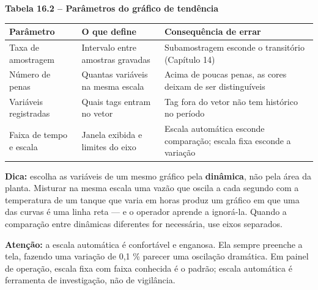 \textbf{Tabela 16.2 -- Parâmetros do gráfico de tendência}

\begin{longtable}[]{@{}
  >{\raggedright\arraybackslash}p{}
  >{\raggedright\arraybackslash}p{}
  >{\raggedright\arraybackslash}p{}@{}}
\toprule\noalign{}
\begin{minipage}[b]{\linewidth}\raggedright
Parâmetro
\end{minipage} & \begin{minipage}[b]{\linewidth}\raggedright
O que define
\end{minipage} & \begin{minipage}[b]{\linewidth}\raggedright
Consequência de errar
\end{minipage} \\
\midrule\noalign{}
\endhead
\bottomrule\noalign{}
\endlastfoot
Taxa de amostragem & Intervalo entre amostras gravadas & Subamostragem esconde o transitório (Capítulo 14) \\
Número de penas & Quantas variáveis na mesma escala & Acima de poucas penas, as cores deixam de ser distinguíveis \\
Variáveis registradas & Quais tags entram no vetor & Tag fora do vetor não tem histórico no período \\
Faixa de tempo e escala & Janela exibida e limites do eixo & Escala automática esconde comparação; escala fixa esconde a variação \\
\end{longtable}

\begin{caixadica}

\textbf{Dica:} escolha as variáveis de um mesmo gráfico pela \textbf{dinâmica}, não pela área da planta.
Misturar na mesma escala uma vazão que oscila a cada segundo com a temperatura de um tanque que
varia em horas produz um gráfico em que uma das curvas é uma linha reta --- e o operador aprende a
ignorá-la. Quando a comparação entre dinâmicas diferentes for necessária, use eixos separados.

\end{caixadica}

\begin{caixaatencao}

\textbf{Atenção:} a escala automática é confortável e enganosa. Ela sempre preenche a tela, fazendo
uma variação de 0,1 \% parecer uma oscilação dramática. Em painel de operação, escala fixa com
faixa conhecida é o padrão; escala automática é ferramenta de investigação, não de vigilância.

\end{caixaatencao}

